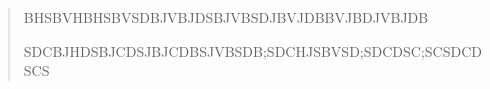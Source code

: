 


\begin{abstract}


BHSBVHBHSBVSDBJVBJDSBJVBSDJBVJDBBVJBDJVBJDB





\begin{keywords}
SDCBJHDSBJCDSJBJCDBSJVBSDB;SDCHJSBVSD;SDCDSC;SCSDCDSCS
\end{keywords}


\end{abstract}